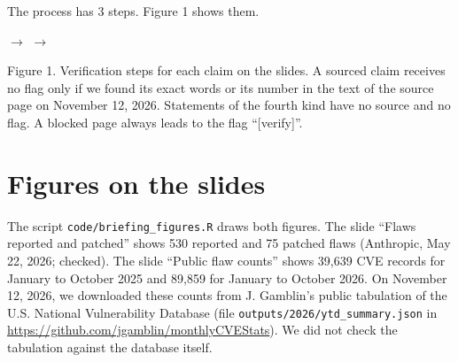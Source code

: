 \documentclass[10pt]{article}
\begin{document}
The process has 3 steps. Figure 1 shows them.

\begin{center}
\setlength{\fboxsep}{6pt}
$\rightarrow$
$\rightarrow$
\par\smallskip
{\small Figure 1. Verification steps for each claim on the slides. A sourced claim receives no flag only if we found its exact words or its number in the text of the source page on November 12, 2026. Statements of the fourth kind have no source and no flag. A blocked page always leads to the flag ``[verify]''.}
\end{center}

\section*{Figures on the slides}
The script \texttt{code/briefing\_figures.R} draws both figures. The slide ``Flaws reported and patched'' shows 530 reported and 75 patched flaws (Anthropic, May 22, 2026; checked). The slide ``Public flaw counts'' shows 39,639 CVE records for January to October 2025 and 89,859 for January to October 2026. On November 12, 2026, we downloaded these counts from J. Gamblin's public tabulation of the U.S. National Vulnerability Database (file \texttt{outputs/2026/ytd\_summary.json} in \url{https://github.com/jgamblin/monthlyCVEStats}). We did not check the tabulation against the database itself.
\end{document}
